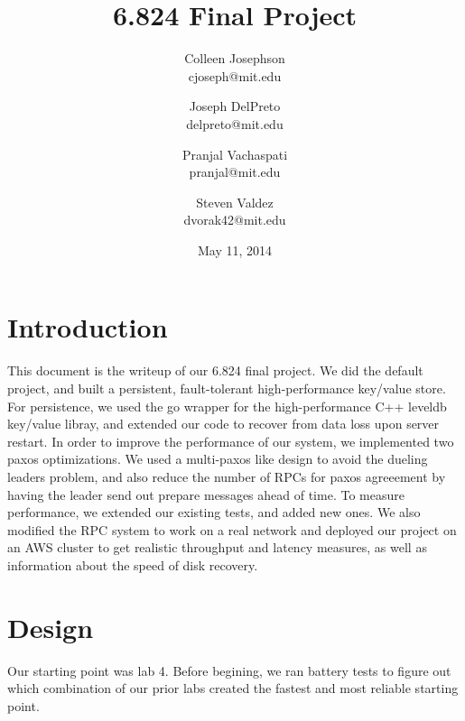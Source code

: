 \documentclass[letterpaper,10pt]{article}
\begin{document}
\title{\Large \bf 6.824 Final Project}
\author{
{\rm Colleen Josephson}\\
cjoseph@mit.edu
\and
{\rm Joseph DelPreto}\\
delpreto@mit.edu
\and
{\rm Pranjal Vachaspati}\\
pranjal@mit.edu
\and
{\rm Steven Valdez}\\
dvorak42@mit.edu
} %

\date{May 11, 2014}

\maketitle


\section{Introduction}
This document is the writeup of our 6.824 final project. We did the
default project, and built a persistent, fault-tolerant
high-performance key/value store. For persistence, we used the go
wrapper for the high-performance C++ leveldb key/value libray, and
extended our code to recover from data loss upon server restart. In
order to improve the performance of our system, we implemented two
paxos optimizations. We used a multi-paxos like design to avoid the
dueling leaders problem, and also reduce the number of RPCs for paxos
agreeement by having the leader send out prepare messages ahead of
time. To measure performance, we extended our existing tests, and
added new ones. We also modified the RPC system to work on a real
network and deployed our project on an AWS cluster to get realistic
throughput and latency measures, as well as information about the
speed of disk recovery.

\section{Design} \label{sec:design}
Our starting point was lab 4. Before begining, we ran battery tests to
figure out which combination of our prior labs created the fastest and
most reliable starting point. 
\end{document}
